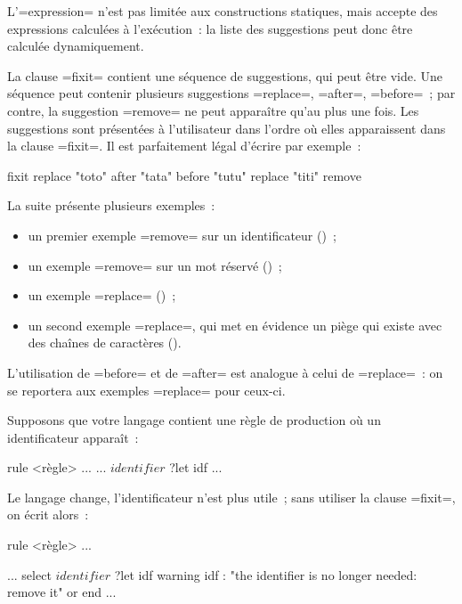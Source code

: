 L'\ggsq=expression= n'est pas limitée aux constructions statiques, mais accepte des expressions calculées à l'exécution~: la liste des suggestions peut donc être calculée dynamiquement.

La clause \ggsq=fixit= contient une séquence de suggestions, qui peut être vide. Une séquence peut contenir plusieurs suggestions \ggsq=replace=, \ggsq=after=, \ggsq=before=~; par contre, la suggestion \ggsq=remove= ne peut apparaître qu'au plus une fois. Les suggestions sont présentées à l'utilisateur dans l'ordre où elles apparaissent dans la clause \ggsq=fixit=. Il est parfaitement légal d'écrire par exemple~:
\begin{galgas4}
fixit {
  replace "toto"
  after "tata"
  before "tutu"
  replace "titi"
  remove
}
\end{galgas4}


La suite présente plusieurs exemples~:
\begin{itemize}
  \item un premier exemple \ggsq=remove= sur un identificateur ()~;
  \item un exemple  \ggsq=remove= sur un mot réservé ()~;
  \item un exemple \ggsq=replace= ()~;
  \item un second exemple \ggsq=replace=, qui met en évidence un piège qui existe avec des chaînes de caractères ().
\end{itemize}

L'utilisation de \ggsq=before= et de \ggsq=after= est analogue à celui de \ggsq=replace=~: on se reportera aux exemples \ggsq=replace= pour ceux-ci.



Supposons que votre langage contient une règle de production où un identificateur apparaît~:

\begin{galgas4}
rule <règle> ... {
  ...
  $identifier$ ?let idf
  ...
}
\end{galgas4}

Le langage change, l'identificateur n'est plus utile~; sans utiliser la clause \ggsq=fixit=, on écrit alors~:

\begin{galgas4}
rule <règle> ... {
  ...
  select
    $identifier$ ?let idf
    warning idf : "the identifier is no longer needed: remove it"
  or
  end
  ...

}
\end{galgas4}


